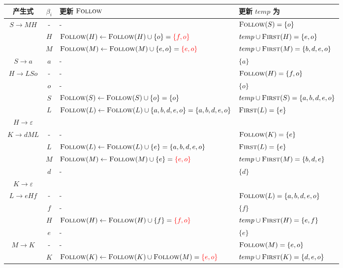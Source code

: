 \documentclass[UTF8]{ctexart}
\newcommand\FIRST{\textsc{First}}
\newcommand\FOLLOW{\textsc{Follow}}
\begin{document}
\begin{landscape}
\begin{table}[p] %
    \centering
    \small
    \begin{tabular}{|c|c|l|l|}
    \hline
        产生式 & $\beta_i$ & 更新 $\FOLLOW$ & 更新 $temp$ 为\\
    \hline
        $S\to MH$ & - & - & $\FOLLOW(S) = \{o\}$ \\
                  & $H$ & $\FOLLOW(H)\gets \FOLLOW(H)\cup\{o\} = \textcolor{red}{\{f,o\}}$ & $temp\cup \FIRST(H) = \{e,o\}$\\
                  & $M$ & $\FOLLOW(M)\gets \FOLLOW(M)\cup\{e,o\} = \textcolor{red}{\{e,o\}}$ & $temp\cup\FIRST(M) = \{b,d,e,o\}$ \\
    \hline
        $S\to a$ & $a$ & - & $\{a\}$ \\
    \hline
        $H\to LSo$ & - & - & $\FOLLOW(H) = \{f,o\}$ \\
                   & $o$ & - & $\{o\}$ \\
                   & $S$ & $\FOLLOW(S)\gets \FOLLOW(S)\cup \{o\} = \{o\}$ & $temp\cup\FIRST(S) = \{a,b,d,e,o\}$ \\
                   & $L$ & $\FOLLOW(L)\gets \FOLLOW(L)\cup \{a,b,d,e,o\} = \{a,b,d,e,o\}$ & $\FIRST(L) = \{e\}$ \\
    \hline
        $H\to \varepsilon$ &&&\\
    \hline
        $K\to dML$ & - & - & $\FOLLOW(K) = \{e\}$ \\
                   & $L$ & $\FOLLOW(L)\gets \FOLLOW(L)\cup\{e\} = \{a,b,d,e,o\}$  & $\FIRST(L) = \{e\}$ \\
                   & $M$ & $\FOLLOW(M)\gets \FOLLOW(M)\cup \{e\} = \textcolor{red}{\{e,o\}}$ & $temp\cup\FIRST(M) = \{b,d,e\}$ \\
                   & $d$ & - & $\{d\}$ \\
    \hline
        $K\to \varepsilon$ &&&\\
    \hline
        $L\to eHf$ & - & - & $\FOLLOW(L) = \{a,b,d,e,o\}$ \\
                   & $f$ & - & $\{f\}$ \\
                   & $H$ & $\FOLLOW(H) \gets \FOLLOW(H) \cup\{f\} = \textcolor{red}{\{f,o\}}$ & $temp\cup\FIRST(H) = \{e,f\}$ \\
                   & $e$ & - & $\{e\}$ \\
    \hline
        $M\to K$ & - & - & $\FOLLOW(M) = \{e,o\}$ \\
                 & $K$ & $\FOLLOW(K)\gets \FOLLOW(K)\cup\FOLLOW(M) = \textcolor{red}{\{e,o\}}$ & $temp\cup\FIRST(K) = \{d,e,o\}$ \\

\end{tabular}
\end{table}
\end{landscape}
\end{document}
